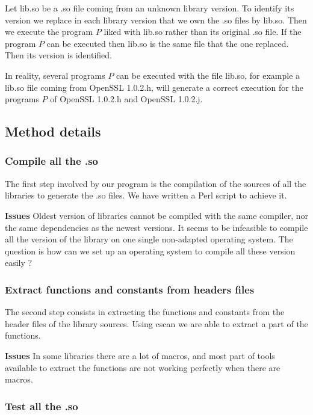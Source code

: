 \documentclass{article}
\begin{document}
	Let lib.so be a .so file coming from an unknown library version. To identify its version we replace in each library version that we own the .so files by lib.so. Then we execute the program $P$ liked with lib.so rather than its original .so file.
 If the program $P$ can be executed then lib.so is the same file that the one replaced. Then its version is identified.
 
 In reality, several programs $P$ can be executed with the file lib.so, for example a lib.so file coming from OpenSSL 1.0.2.h, will generate a correct execution for the programs $P$ of OpenSSL 1.0.2.h and OpenSSL 1.0.2.j.

	
		
    \subsection{Method details}
	\subsubsection{Compile all the .so}
	
	The first step involved by our program is the compilation of the sources of all the libraries to generate the .so files. We have written a Perl script to achieve it.
	
	\textbf{Issues} Oldest version of libraries cannot be compiled with the same compiler, nor the same dependencies as the newest versions. It seems to be infeasible to compile all the version of the library on one single non-adapted operating system. The question is how can we set up an operating system to compile all these version easily ?
	
   
   	\subsubsection{Extract functions and constants from headers files}
   	
   	The second step consists in extracting the functions and constants from the header files of the library sources. Using cscan we are able to extract a part of the functions.
   	
   	\textbf{Issues} In some libraries there are a lot of macros, and most part of tools available to extract the functions are not working perfectly when there are macros.   		
   	
   	
   	\subsubsection{Test all the .so}
   		
\end{document}
